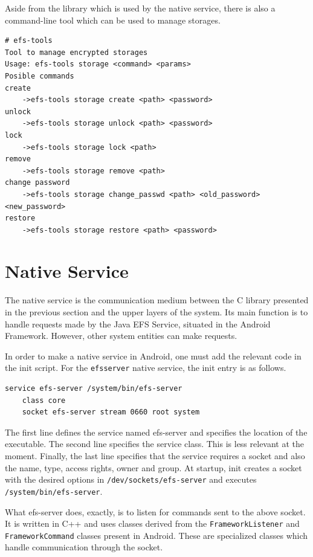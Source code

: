 Aside from the library which is used by the native service, there is also a command-line tool which can be used to manage storages. 

\begin{lstlisting}[numbers=none, basicstyle=\footnotesize, caption=efs-tools binary, label=lst:efs-tools]
# efs-tools                                              
Tool to manage encrypted storages
Usage: efs-tools storage <command> <params>
Posible commands
create
	->efs-tools storage create <path> <password>
unlock
	->efs-tools storage unlock <path> <password>
lock
	->efs-tools storage lock <path>
remove
	->efs-tools storage remove <path>
change password
	->efs-tools storage change_passwd <path> <old_password> <new_password>
restore
	->efs-tools storage restore <path> <password>
\end{lstlisting}

\section{Native Service}
\label{sec:native-service-multi-user}

The native service is the communication medium between the C library presented in the previous section and the upper layers of the system. Its main function is to handle requests made by the Java EFS Service, situated in the Android Framework. However, other system entities can make requests.

In order to make a native service in Android, one must add the relevant code in the init script.
For the \texttt{efsserver} native service, the init entry is as follows.

\begin{lstlisting}[numbers=none, caption=efsserver init entry, label=lst:efsserver-init]
service efs-server /system/bin/efs-server
    class core
    socket efs-server stream 0660 root system
\end{lstlisting}

The first line defines the service named efs-server and specifies the location of the executable.
The second line specifies the service class. This is less relevant at the moment. Finally, the last line specifies that the service requires a socket and also the name, type, access rights, owner and group. At startup, init creates a socket with the desired options in \texttt{/dev/sockets/efs-server} and executes \texttt{/system/bin/efs-server}.

What efs-server does, exactly, is to listen for commands sent to the above socket. It is written in C++ and uses classes derived from the \texttt{FrameworkListener} and \texttt{FrameworkCommand} classes present in Android. These are specialized classes which handle communication through the socket.

